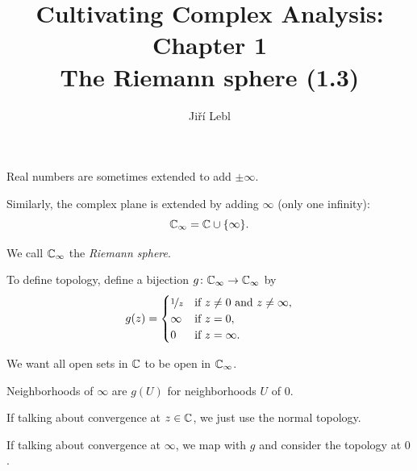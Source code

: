 \documentclass[10pt,aspectratio=169]{beamer}
\author{Ji\v{r}\'i Lebl}
\institute[OSU]{%
Departemento pri Matematiko de Oklahoma {\^S}tata Universitato}
\title{Cultivating Complex Analysis: Chapter 1\\%
The Riemann sphere (1.3)}
\date{}
\begin{document}
\begin{frame}
\titlepage
\end{frame}

\begin{frame}
Real numbers are sometimes extended to add $\pm \infty$.

\medskip
\pause

Similarly, the complex plane is extended by adding $\infty$ (only one
infinity):
\[
{\mathbb{C}}_{\infty} = {\mathbb{C}} \cup \{ \infty \} .
\]

\pause
We call ${\mathbb{C}}_{\infty}$ the \emph{Riemann sphere}.

\medskip
\pause

To define topology, define a bijection $g \colon {\mathbb{C}}_\infty \to {\mathbb{C}}_\infty$ by
\[
g(z) =
\begin{cases}
\nicefrac{1}{z} & \text{if } z \not= 0 \text{ and } z \not= \infty, \\
\infty & \text{if } z = 0, \\
0 & \text{if } z = \infty.
\end{cases}
\]

\pause

We want all open sets in ${\mathbb{C}}$ to be open in ${\mathbb{C}}_\infty$.

\medskip
\pause

Neighborhoods of $\infty$ are $g(U)$ for neighborhoods $U$ of $0$.

\medskip
\pause

If talking about convergence at $z \in {\mathbb{C}}$, we just use the normal
topology.

\medskip
\pause

If talking about convergence at $\infty$, we map with $g$
and consider the topology at $0$.
\end{frame}
\end{document}
